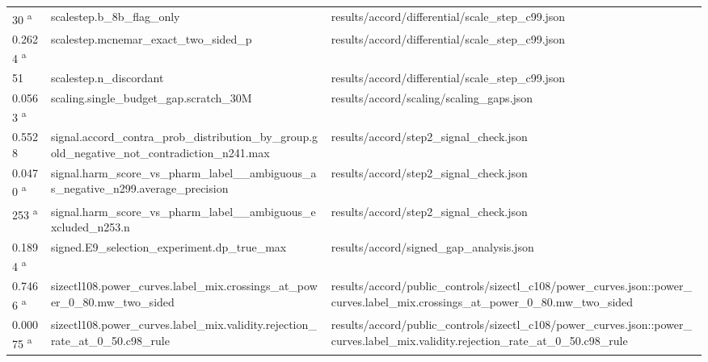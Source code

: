 \begin{longtable}{@{}p{0.7in}p{1.9in}p{2.6in}@{}}
30 \textsuperscript{a} & scalestep.\allowbreak{}b\_8b\_flag\_only & results/\allowbreak{}accord/\allowbreak{}differential/\allowbreak{}scale\_step\_c99.\allowbreak{}json\\
0.2624 \textsuperscript{a} & scalestep.\allowbreak{}mcnemar\_exact\_two\_sided\_p & results/\allowbreak{}accord/\allowbreak{}differential/\allowbreak{}scale\_step\_c99.\allowbreak{}json\\
51 & scalestep.\allowbreak{}n\_discordant & results/\allowbreak{}accord/\allowbreak{}differential/\allowbreak{}scale\_step\_c99.\allowbreak{}json\\
0.0563 \textsuperscript{a} & scaling.\allowbreak{}single\_budget\_gap.\allowbreak{}scratch\_30M & results/\allowbreak{}accord/\allowbreak{}scaling/\allowbreak{}scaling\_gaps.\allowbreak{}json\\
0.5528 & signal.\allowbreak{}accord\_contra\_prob\_distribution\_by\_group.\allowbreak{}gold\_negative\_not\_contradiction\_n241.\allowbreak{}max & results/\allowbreak{}accord/\allowbreak{}step2\_signal\_check.\allowbreak{}json\\
0.0470 \textsuperscript{a} & signal.\allowbreak{}harm\_score\_vs\_pharm\_label\_\_ambiguous\_as\_negative\_n299.\allowbreak{}average\_precision & results/\allowbreak{}accord/\allowbreak{}step2\_signal\_check.\allowbreak{}json\\
253 \textsuperscript{a} & signal.\allowbreak{}harm\_score\_vs\_pharm\_label\_\_ambiguous\_excluded\_n253.\allowbreak{}n & results/\allowbreak{}accord/\allowbreak{}step2\_signal\_check.\allowbreak{}json\\
0.1894 \textsuperscript{a} & signed.\allowbreak{}E9\_selection\_experiment.\allowbreak{}dp\_true\_max & results/\allowbreak{}accord/\allowbreak{}signed\_gap\_analysis.\allowbreak{}json\\
0.7466 \textsuperscript{a} & sizectl108.\allowbreak{}power\_curves.\allowbreak{}label\_mix.\allowbreak{}crossings\_at\_power\_0\_80.\allowbreak{}mw\_two\_sided & results/\allowbreak{}accord/\allowbreak{}public\_controls/\allowbreak{}sizectl\_c108/\allowbreak{}power\_curves.\allowbreak{}json::power\_curves.\allowbreak{}label\_mix.\allowbreak{}crossings\_at\_power\_0\_80.\allowbreak{}mw\_two\_sided\\
0.00075 \textsuperscript{a} & sizectl108.\allowbreak{}power\_curves.\allowbreak{}label\_mix.\allowbreak{}validity.\allowbreak{}rejection\_rate\_at\_0\_50.\allowbreak{}c98\_rule & results/\allowbreak{}accord/\allowbreak{}public\_controls/\allowbreak{}sizectl\_c108/\allowbreak{}power\_curves.\allowbreak{}json::power\_curves.\allowbreak{}label\_mix.\allowbreak{}validity.\allowbreak{}rejection\_rate\_at\_0\_50.\allowbreak{}c98\_rule\\

\end{longtable}
